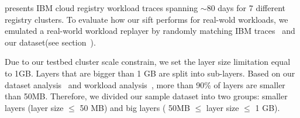 \cite{xxx} presents IBM cloud registry workload traces spanning $\sim$80 days for 7 different registry clusters. 
To evaluate how our sift performs for real-wold workloads,
we emulated a real-world workload replayer by randomly matching IBM traces~\cite{xxx} and our dataset(see section~\cite{xxx}). 

Due to our testbed cluster scale constrain, we set the layer size limitation equal to 1GB. 
Layers that are bigger than 1 GB are split into sub-layers.
Based on our dataset analysis~\cite{xxx} and workload analysis~\cite{xxx},
more than 90\% of layers are smaller than 50MB. 
Therefore, we divided our sample dataset into two groups:
smaller layers (layer size $\leq$ 50 MB) and big layers ( 50MB $\leq$ layer size $\leq$ 1 GB).


%
